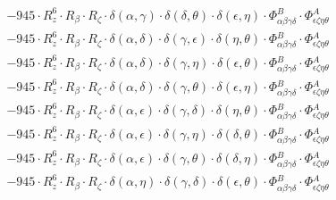 \documentclass{article}
\begin{document}
\begin{equation}
\begin{array}{c}
 \\[0.2em] 		 - 945 \cdot R_{z}^{6} \cdot R_{\beta{}} \cdot R_{\zeta{}} \cdot \delta{}\left(\alpha{}, \gamma{}\right) \cdot \delta{}\left(\delta{}, \theta{}\right) \cdot \delta{}\left(\epsilon{}, \eta{}\right) \cdot \Phi{}^{B}_{\alpha{}\beta{}\gamma{}\delta{}} \cdot \Phi{}^{A}_{\epsilon{}\zeta{}\eta{}\theta{}} 
 \\[0.2em] 		 - 945 \cdot R_{z}^{6} \cdot R_{\beta{}} \cdot R_{\zeta{}} \cdot \delta{}\left(\alpha{}, \delta{}\right) \cdot \delta{}\left(\gamma{}, \epsilon{}\right) \cdot \delta{}\left(\eta{}, \theta{}\right) \cdot \Phi{}^{B}_{\alpha{}\beta{}\gamma{}\delta{}} \cdot \Phi{}^{A}_{\epsilon{}\zeta{}\eta{}\theta{}} 
 \\[0.2em] 		 - 945 \cdot R_{z}^{6} \cdot R_{\beta{}} \cdot R_{\zeta{}} \cdot \delta{}\left(\alpha{}, \delta{}\right) \cdot \delta{}\left(\gamma{}, \eta{}\right) \cdot \delta{}\left(\epsilon{}, \theta{}\right) \cdot \Phi{}^{B}_{\alpha{}\beta{}\gamma{}\delta{}} \cdot \Phi{}^{A}_{\epsilon{}\zeta{}\eta{}\theta{}} 
 \\[0.2em] 		 - 945 \cdot R_{z}^{6} \cdot R_{\beta{}} \cdot R_{\zeta{}} \cdot \delta{}\left(\alpha{}, \delta{}\right) \cdot \delta{}\left(\gamma{}, \theta{}\right) \cdot \delta{}\left(\epsilon{}, \eta{}\right) \cdot \Phi{}^{B}_{\alpha{}\beta{}\gamma{}\delta{}} \cdot \Phi{}^{A}_{\epsilon{}\zeta{}\eta{}\theta{}} 
 \\[0.2em] 		 - 945 \cdot R_{z}^{6} \cdot R_{\beta{}} \cdot R_{\zeta{}} \cdot \delta{}\left(\alpha{}, \epsilon{}\right) \cdot \delta{}\left(\gamma{}, \delta{}\right) \cdot \delta{}\left(\eta{}, \theta{}\right) \cdot \Phi{}^{B}_{\alpha{}\beta{}\gamma{}\delta{}} \cdot \Phi{}^{A}_{\epsilon{}\zeta{}\eta{}\theta{}} 
 \\[0.2em] 		 - 945 \cdot R_{z}^{6} \cdot R_{\beta{}} \cdot R_{\zeta{}} \cdot \delta{}\left(\alpha{}, \epsilon{}\right) \cdot \delta{}\left(\gamma{}, \eta{}\right) \cdot \delta{}\left(\delta{}, \theta{}\right) \cdot \Phi{}^{B}_{\alpha{}\beta{}\gamma{}\delta{}} \cdot \Phi{}^{A}_{\epsilon{}\zeta{}\eta{}\theta{}} 
 \\[0.2em] 		 - 945 \cdot R_{z}^{6} \cdot R_{\beta{}} \cdot R_{\zeta{}} \cdot \delta{}\left(\alpha{}, \epsilon{}\right) \cdot \delta{}\left(\gamma{}, \theta{}\right) \cdot \delta{}\left(\delta{}, \eta{}\right) \cdot \Phi{}^{B}_{\alpha{}\beta{}\gamma{}\delta{}} \cdot \Phi{}^{A}_{\epsilon{}\zeta{}\eta{}\theta{}} 
 \\[0.2em] 		 - 945 \cdot R_{z}^{6} \cdot R_{\beta{}} \cdot R_{\zeta{}} \cdot \delta{}\left(\alpha{}, \eta{}\right) \cdot \delta{}\left(\gamma{}, \delta{}\right) \cdot \delta{}\left(\epsilon{}, \theta{}\right) \cdot \Phi{}^{B}_{\alpha{}\beta{}\gamma{}\delta{}} \cdot \Phi{}^{A}_{\epsilon{}\zeta{}\eta{}\theta{}} 

\end{array}
\end{equation}
\end{document}
